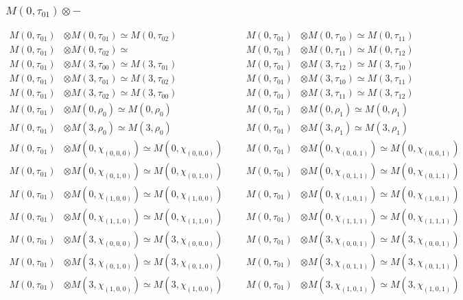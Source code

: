 \subsubsection{$ M(0,\tau_{01})\otimes -$}
\begin{align*}
M(0,\tau_{01}) &\otimes M(0,\tau_{01}) \simeq M(0,\tau_{02}) &&& M(0,\tau_{01}) &\otimes M(0,\tau_{10}) \simeq M(0,\tau_{11})\\
M(0,\tau_{01}) &\otimes M(0,\tau_{02}) \simeq  &&& M(0,\tau_{01}) &\otimes M(0,\tau_{11}) \simeq M(0,\tau_{12})\\
M(0,\tau_{01}) &\otimes M(3,\tau_{00}) \simeq M(3,\tau_{01}) &&& M(0,\tau_{01}) &\otimes M(3,\tau_{12}) \simeq M(3,\tau_{10})\\
M(0,\tau_{01}) &\otimes M(3,\tau_{01}) \simeq M(3,\tau_{02}) &&& M(0,\tau_{01}) &\otimes M(3,\tau_{10}) \simeq M(3,\tau_{11})\\
M(0,\tau_{01}) &\otimes M(3,\tau_{02}) \simeq M(3,\tau_{00}) &&& M(0,\tau_{01}) &\otimes M(3,\tau_{11}) \simeq M(3,\tau_{12})\\
M(0,\tau_{01}) &\otimes M(0,\rho_{0}) \simeq M(0,\rho_{0}) &&& M(0,\tau_{01}) &\otimes M(0,\rho_{1}) \simeq M(0,\rho_{1})\\
M(0,\tau_{01}) &\otimes M(3,\rho_{0}) \simeq M(3,\rho_{0}) &&& M(0,\tau_{01}) &\otimes M(3,\rho_{1}) \simeq M(3,\rho_{1})\\
M(0,\tau_{01}) &\otimes M(0,\chi_{(0,0,0)}) \simeq M(0,\chi_{(0,0,0)}) &&& M(0,\tau_{01}) &\otimes M(0,\chi_{(0,0,1)}) \simeq M(0,\chi_{(0,0,1)})\\
M(0,\tau_{01}) &\otimes M(0,\chi_{(0,1,0)}) \simeq M(0,\chi_{(0,1,0)}) &&& M(0,\tau_{01}) &\otimes M(0,\chi_{(0,1,1)}) \simeq M(0,\chi_{(0,1,1)})\\
M(0,\tau_{01}) &\otimes M(0,\chi_{(1,0,0)}) \simeq M(0,\chi_{(1,0,0)}) &&& M(0,\tau_{01}) &\otimes M(0,\chi_{(1,0,1)}) \simeq M(0,\chi_{(1,0,1)})\\
M(0,\tau_{01}) &\otimes M(0,\chi_{(1,1,0)}) \simeq M(0,\chi_{(1,1,0)}) &&& M(0,\tau_{01}) &\otimes M(0,\chi_{(1,1,1)}) \simeq M(0,\chi_{(1,1,1)})\\
M(0,\tau_{01}) &\otimes M(3,\chi_{(0,0,0)}) \simeq M(3,\chi_{(0,0,0)}) &&& M(0,\tau_{01}) &\otimes M(3,\chi_{(0,0,1)}) \simeq M(3,\chi_{(0,0,1)})\\
M(0,\tau_{01}) &\otimes M(3,\chi_{(0,1,0)}) \simeq M(3,\chi_{(0,1,0)}) &&& M(0,\tau_{01}) &\otimes M(3,\chi_{(0,1,1)}) \simeq M(3,\chi_{(0,1,1)})\\
M(0,\tau_{01}) &\otimes M(3,\chi_{(1,0,0)}) \simeq M(3,\chi_{(1,0,0)}) &&& M(0,\tau_{01}) &\otimes M(3,\chi_{(1,0,1)}) \simeq M(3,\chi_{(1,0,1)})\\

\end{align*}
